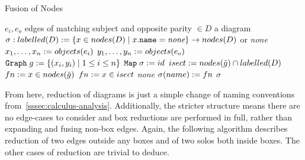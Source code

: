         \begin{breakablealgorithm}
            \caption{Fusion of Nodes}
            \begin{algorithmic}[1]
                \Require$e_i, e_o$ edges of matching subject and opposite parity $\in D$ a diagram
                \Ensure$\sigma : labelled(D) := \{x \in nodes(D) \; | \; x.\texttt{name} = \textit{none}\} \rightarrow nodes(D)$ or \textit{none}
                    \State$x_1, \ldots, x_n := objects(e_i)$
                    \State$y_1, \ldots, y_n := objects(e_o)$
                    \State$\texttt{Graph} \; g := \{(x_i, y_i) \; | \; 1 \leq i \leq n\}$
                    \State$\texttt{Map} \; \sigma := id$
                        \State$isect := nodes(\bar{g}) \cap labelled(D)$
                            \State$fn := x \in nodes(\bar{g})$
                            \State$fn := x \in isect$
                        \Else
                            \State\Return\textit{none}
                        \EndIf
                            \State$\sigma(name) := fn$
                        \EndFor
                    \EndFor
                    \State\Return$\sigma$
                \EndFunction
            \end{algorithmic}
        \end{breakablealgorithm}

        From here, reduction of diagrams is just a simple change of naming conventions from~\ref{sssec:calculus-analysis}.
        Additionally, the stricter structure means there are no edge-cases to consider and box reductions are performed in full, rather than expanding and fusing non-box edges.
        Again, the following algorithm describes reduction of two edges outside any boxes and of two solos both inside boxes.
        The other cases of reduction are trivial to deduce.

